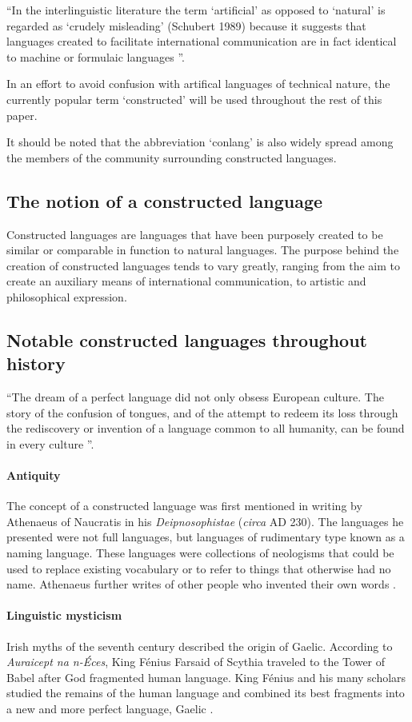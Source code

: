 \documentclass[14pt, a4paper]{extreport}
\begin{document}
``In the interlinguistic literature the term `artificial' as opposed to `natural' is regarded as `crudely misleading' (Schubert 1989) because it suggests that languages created to facilitate international communication are in fact identical to machine or formulaic languages \parencite[45]{stria}''.

In an effort to avoid confusion with artifical languages of technical nature, the currently popular term `constructed' will be used throughout the rest of this paper.

It should be noted that the abbreviation `conlang' is also widely spread among the members of the community surrounding constructed languages.

\subsection{The notion of a constructed language}
Constructed languages are languages that have been purposely created to be similar or comparable in function to natural languages. The purpose behind the creation of constructed languages tends to vary greatly, ranging from the aim to create an auxiliary means of international communication, to artistic and philosophical expression.
    \subsection{Notable constructed languages throughout history}
``The dream of a perfect language did not only obsess European culture. The story of the confusion of tongues, and of the attempt to redeem its loss through the rediscovery or invention of a language common to all humanity, can be found in every culture \parencite[1]{eco}''.
        \paragraph{Antiquity}
The concept of a constructed language was first mentioned in writing by Athenaeus of Naucratis in his \textit{Deipnosophistae} (\textit{circa} \textsc{AD} 230). The languages he presented were not full languages, but languages of rudimentary type known as a naming language. These languages were collections of neologisms that could be used to replace existing vocabulary or to refer to things that otherwise had no name. Athenaeus further writes of other people who invented their own words \parencite{sanders}.
        \paragraph{Linguistic mysticism}
Irish myths of the seventh century described the origin of Gaelic. According to \textit{Auraicept na n-Éces}, King Fénius Farsaid of Scythia traveled to the Tower of Babel after God fragmented human language. King Fénius and his many scholars studied the remains of the human language and combined its best fragments into a new and more perfect language, Gaelic \parencite{williams}.
\end{document}
